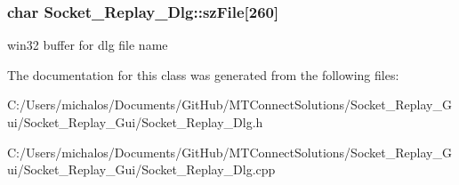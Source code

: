 \subsubsection[{sz\+File}]{\setlength{\rightskip}{0pt plus 5cm}char Socket\+\_\+\+Replay\+\_\+\+Dlg\+::sz\+File\mbox{[}260\mbox{]}\hspace{0.3cm}{\ttfamily [protected]}}\label{class_socket___replay___dlg_abe629565b9f82aff477a8e1b9c605073}
win32 buffer for dlg file name 

The documentation for this class was generated from the following files\+:\begin{DoxyCompactItemize}
\item 
C\+:/\+Users/michalos/\+Documents/\+Git\+Hub/\+M\+T\+Connect\+Solutions/\+Socket\+\_\+\+Replay\+\_\+\+Gui/\+Socket\+\_\+\+Replay\+\_\+\+Gui/Socket\+\_\+\+Replay\+\_\+\+Dlg.\+h\item 
C\+:/\+Users/michalos/\+Documents/\+Git\+Hub/\+M\+T\+Connect\+Solutions/\+Socket\+\_\+\+Replay\+\_\+\+Gui/\+Socket\+\_\+\+Replay\+\_\+\+Gui/Socket\+\_\+\+Replay\+\_\+\+Dlg.\+cpp\end{DoxyCompactItemize}
